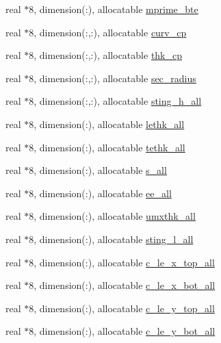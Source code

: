 \begin{DoxyCompactItemize}
\item 
real $\ast$8, dimension(\+:), allocatable \hyperlink{namespaceglobvar_a6efd6498d9aae9dcb41000cdd23ddf73}{mprime\+\_\+bte}
\item 
real $\ast$8, dimension(\+:,\+:), allocatable \hyperlink{namespaceglobvar_a533758dc33d13c7f7d7fc3b2c1b14f2b}{curv\+\_\+cp}
\item 
real $\ast$8, dimension(\+:,\+:), allocatable \hyperlink{namespaceglobvar_a621e5e0db93b47d60b4a804c9fe96ac2}{thk\+\_\+cp}
\item 
real $\ast$8, dimension(\+:,\+:), allocatable \hyperlink{namespaceglobvar_aca37141a129c261c28872a486944fece}{sec\+\_\+radius}
\item 
real $\ast$8, dimension(\+:,\+:), allocatable \hyperlink{namespaceglobvar_afab867a5ed560efb35549138a3645ead}{sting\+\_\+h\+\_\+all}
\item 
real $\ast$8, dimension(\+:), allocatable \hyperlink{namespaceglobvar_ac8f321181d3578817641ebd2f3ecfce3}{lethk\+\_\+all}
\item 
real $\ast$8, dimension(\+:), allocatable \hyperlink{namespaceglobvar_a0e616405e514a293d4730e14ff716027}{tethk\+\_\+all}
\item 
real $\ast$8, dimension(\+:), allocatable \hyperlink{namespaceglobvar_ad577edfa4a4ef2f6d3bb184a4e0931b1}{s\+\_\+all}
\item 
real $\ast$8, dimension(\+:), allocatable \hyperlink{namespaceglobvar_a7037a7dd30b11e09190ebb70e483c63f}{ee\+\_\+all}
\item 
real $\ast$8, dimension(\+:), allocatable \hyperlink{namespaceglobvar_a1e3e80a1760c544775d54a22dc950fef}{umxthk\+\_\+all}
\item 
real $\ast$8, dimension(\+:), allocatable \hyperlink{namespaceglobvar_a598b9f7682973868c54d34e1a05ad030}{sting\+\_\+l\+\_\+all}
\item 
real $\ast$8, dimension(\+:), allocatable \hyperlink{namespaceglobvar_a402f13249e098adf069fdb47247cc952}{c\+\_\+le\+\_\+x\+\_\+top\+\_\+all}
\item 
real $\ast$8, dimension(\+:), allocatable \hyperlink{namespaceglobvar_aec9bec955f6acfec428227dba9b7853d}{c\+\_\+le\+\_\+x\+\_\+bot\+\_\+all}
\item 
real $\ast$8, dimension(\+:), allocatable \hyperlink{namespaceglobvar_a3675f2363320e97186b54bdf83c57fe0}{c\+\_\+le\+\_\+y\+\_\+top\+\_\+all}
\item 
real $\ast$8, dimension(\+:), allocatable \hyperlink{namespaceglobvar_a1e99d4cf7e322ee5f4febfa67e23249a}{c\+\_\+le\+\_\+y\+\_\+bot\+\_\+all}

\end{DoxyCompactItemize}
